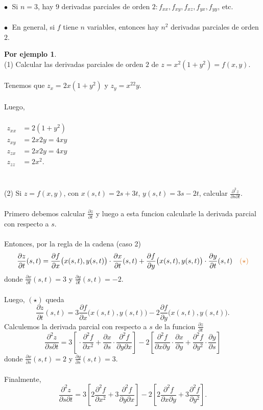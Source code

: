 \documentclass{article}
\theoremstyle{definition}
\newtheorem*{ej}{Por ejemplo}
\theoremstyle{remark}
\newcommand\bl{$\bullet\;$}
\begin{document}
\textcolor{verdep2}{\bl} Si $n=3$, hay $9$ derivadas parciales de orden $2 : f_{xx},f_{xy},f_{xz},f_{yx},f_{yy}$, etc. \\\\
\textcolor{verdep2}{\bl} En general, si $f$ tiene $n$ variables, entonces hay $n^2$ derivadas parciales de orden $2$. \pagebreak
\begin{ej}
  \;\\ 
  \textcolor{verdep2}{(1)} Calcular las derivadas parciales de orden $2$ de $z = x^2 (1+y^2)=f(x,y)$.\\\\
  Tenemos que $z_x=2x(1+y^2)$ \; y \; $z_y=x^22y$.\\\\ Luego,\\\\ $\begin{aligned}
    z_{xx} & = 2(1+y^2) \\
    z_{xy} & = 2x2y=4xy \\
    z_{zx} & = 2x2y=4xy \\
    z_{zz} & = 2x^2.
  \end{aligned}$
  \\\\\\
  \textcolor{verdep2}{(2)} Si $z=f(x,y)$, con $x(s,t)=2s+3t$, $y(s,t)=3s-2t$, calcular $\frac{\partial^2 z}{\partial s \partial t}$.\\\\
  Primero debemos calcular $\frac{\partial z}{\partial t}$ y luego a esta funcion calcularle la derivada parcial con respecto a $s$. \\\\ Entonces, por la regla de la cadena (caso 2) \[
    \frac{\partial z}{\partial t}(s,t)=\frac{\partial f}{\partial x}\big(x(s,t),y(s,t)\big) \cdot \frac{\partial x}{\partial t}(s,t)+\frac{\partial f}{\partial y}\big(x(s,t),y(s,t)\big) \cdot \frac{\partial y}{\partial t}(s,t) \quad \textcolor{rojop2}{(\star)}
    \] donde $\frac{\partial x}{\partial t}(s,t)=3$ \; y \; $\frac{\partial y}{\partial t}(s,t)=-2.$ \\\\ Luego, \textcolor{rojop2}{$(\star)$} queda \[
    \frac{\partial z}{\partial t}(s,t)=3\frac{\partial f}{\partial x}\big(x(s,t),y(s,t)\big)-2\frac{\partial f}{\partial y}\big(x(s,t),y(s,t)\big).
    \]Calculemos la derivada parcial con respecto a $s$ de la funcion $\frac{\partial z}{\partial t}$ \[
    \frac{\partial^2z}{\partial s\partial t}=3\left[\frac{}{}\cdot \frac{\partial^2 f}{\partial x^2} + \frac{\partial x}{\partial s} \cdot \frac{\partial^2 f}{\partial y \partial x}\right]-2\left[\frac{\partial^2 f}{\partial x \partial y} \cdot \frac{\partial x}{\partial y} + \frac{\partial^2 f}{\partial y^2} \cdot \frac{\partial y}{\partial s}\right]
    \] donde $\frac{\partial x}{\partial s}(s,t)=2$ \; y \; $\frac{\partial y}{\partial s}(s,t)=3$.\\\\ Finalmente, \[
    \frac{\partial^2 z}{\partial s \partial t}=3\left[2 \frac{\partial^2 f}{\partial x^2}+3 \frac{\partial^2 f}{\partial y \partial x}\right]-2\left[2 \frac{\partial^2 f}{\partial x \partial y}+3\frac{\partial^2 f}{\partial y^2}\right].
  \]
\end{ej}
\end{document}
